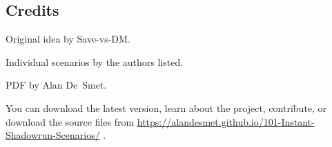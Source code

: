 \documentclass[letterpaper,onecolumn,10pt]{article}
\begin{document}
\begin{multicols}{2}


\tableofcontents






















































\section*{Credits}

Original idea by Save-vs-DM.

Individual scenarios by the authors listed.

PDF by Alan De~Smet.

You can download the latest version, learn about the project, contribute, or download the source files from \url{https://alandesmet.github.io/101-Instant-Shadowrun-Scenarios/} .





\end{multicols}
\end{document}
